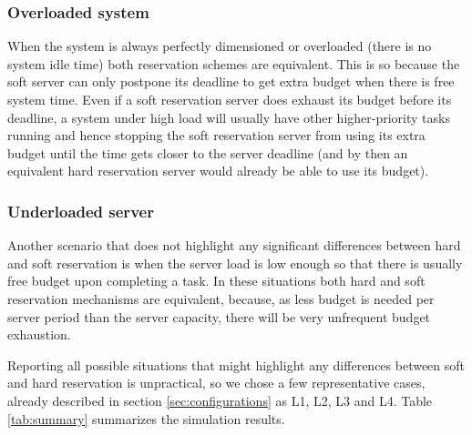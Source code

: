 \documentclass[times, 10pt,twocolumn]{article}
\begin{document}
\subsubsection{Overloaded system}
\label{sec:system-load}

When the system is always perfectly dimensioned or overloaded (there
is no system idle time) both reservation schemes are equivalent. This
is so because the soft server can only postpone its deadline to get
extra budget when there is free system time. Even if a soft
reservation server does exhaust its budget before its deadline, a
system under high load will usually have other higher-priority tasks
running and hence stopping the soft reservation server from using its
extra budget until the time gets closer to the server deadline (and by
then an equivalent hard reservation server would already be able to
use its budget).

\subsubsection{Underloaded server}
\label{sec:server-load}

Another scenario that does not highlight any significant differences
between hard and soft reservation is when the server load is low
enough so that there is usually free budget upon completing a task. In
these situations both hard and soft reservation mechanisms are
equivalent, because, as less budget is needed per server period than
the server capacity, there will be very unfrequent budget
exhaustion.

\label{sec:indiv-simul-results}

Reporting all possible situations that might highlight any differences
between soft and hard reservation is unpractical, so we chose a few
representative cases, already described in section
\ref{sec:configurations} as L1, L2, L3 and L4. Table \ref{tab:summary}
summarizes the simulation results.
\end{document}

